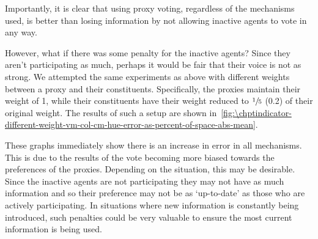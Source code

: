 Importantly, it is clear that using proxy voting, regardless of the mechanisms used,
is better than losing information by not allowing inactive agents to vote in any way.

However, what if there was some penalty for the inactive agents?
Since they aren't participating as much, perhaps it would be fair that their voice is
not as strong.
We attempted the same experiments as above with different weights between a proxy and
their constituents.
Specifically, the proxies maintain their weight of 1, while their constituents have
their weight reduced to $\sfrac{1}{5}$ (0.2) of their original weight.
The results of such a setup are shown
in~\autoref{fig:\chptindicator-different-weight-vm-col-cm-hue-error-as-percent-of-space-abs-mean}.

These graphs immediately show there is an increase in error in all mechanisms.
This is due to the results of the vote becoming more biased towards the preferences
of the proxies.
Depending on the situation, this may be desirable.
Since the inactive agents are not participating they may not have as much information
and so their preference may not be as `up-to-date' as those who are actively
participating.
In situations where new information is constantly being introduced, such penalties
could be very valuable to ensure the most current information is being used.

